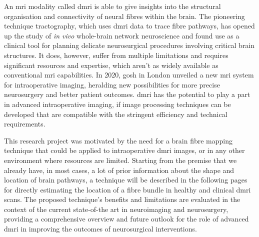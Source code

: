 An \gls{mri} modality called \gls{dmri} is able to give insights into the structural organisation and connectivity of neural fibres within the brain.
The pioneering technique tractography, which uses \gls{dmri} data to trace fibre pathways, has opened up the study of \textit{in vivo} whole-brain network neuroscience and found use as a clinical tool for planning delicate neurosurgical procedures involving critical brain structures.
It does, however, suffer from multiple limitations and requires significant resources and expertise, which aren't as widely available as conventional \gls{mri} capabilities\autocite{GeorgeZakiGhali2020}.
In 2020, \gls{gosh} in London unveiled a new \gls{mri} system for intraoperative imaging, heralding new possibilities for more precise neurosurgery and better patient outcomes.
\gls{dmri} has the potential to play a part in advanced intraoperative imaging, if image processing techniques can be developed that are compatible with the stringent efficiency and technical requirements.

This research project was motivated by the need for a brain fibre mapping technique that could be applied to intraoperative \gls{dmri} images, or in any other environment where resources are limited.
Starting from the premise that we already have, in most cases, a lot of prior information about the shape and location of brain pathways, a technique will be described in the following pages for directly estimating the location of a fibre bundle in healthy and clinical \gls{dmri} scans.
The proposed technique's benefits and limitations are evaluated in the context of the current state-of-the art in neuroimaging and neurosurgery, providing a comprehensive overview and future outlook for the role of advanced \gls{dmri} in improving the outcomes of neurosurgical interventions.

